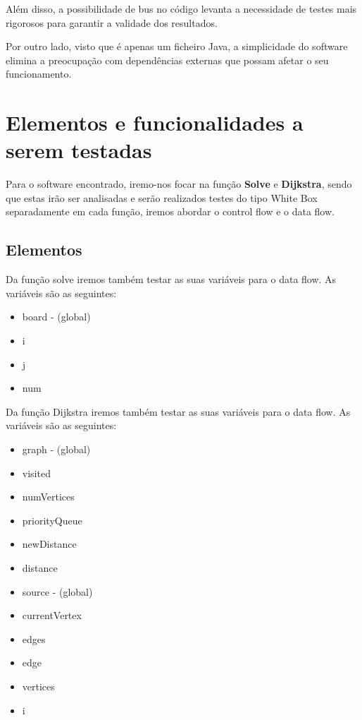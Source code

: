 \documentclass{article}
\begin{document}
Além disso, a possibilidade de bus no código levanta a necessidade de testes mais rigorosos para garantir a validade dos resultados.

Por outro lado, visto que é apenas um ficheiro Java, a simplicidade do software elimina a preocupação com dependências externas que possam afetar o seu funcionamento.

\section{Elementos e funcionalidades a serem testadas}

\texttt{}\par Para o software encontrado, iremo-nos focar na função \textbf{Solve} e \textbf{Dijkstra}, sendo que estas irão ser analisadas e serão realizados testes do tipo White Box separadamente em cada função, iremos abordar o control flow e o data flow.
\subsection{Elementos}
\texttt{}\par Da função solve iremos também testar as suas variáveis para o data flow. As variáveis são as seguintes:\\
\begin{itemize}
    \item board - (global)
    \item i
    \item j 
    \item num
\end{itemize}

\texttt{}\par Da função Dijkstra iremos também testar as suas variáveis para o data flow. As variáveis são as seguintes:\\
\begin{itemize}
    \item graph - (global)
    \item visited
    \item numVertices
    \item priorityQueue
    \item newDistance
    \item distance
    \item source - (global)
    \item currentVertex
    \item edges
    \item edge
    \item vertices
    \item i 
\end{itemize}
\end{document}
